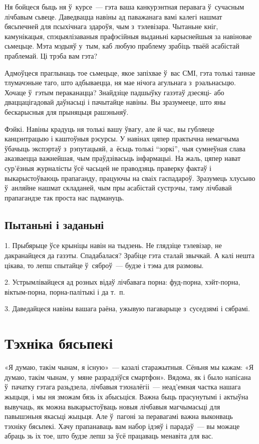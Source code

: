 Ня бойцеся быць ня ў~курсе~--- гэта ваша канкурэнтная перавага ў~сучасным лічбавым сьвеце. Даведвацца навіны ад паважанага вамі калегі нашмат бясьпечней для псыхічнага здароўя, чым з~тэлевізара. Чытаньне кніг, камунікацыя, спэцыялізаваныя прафэсійныя выданьні карыснейшыя за навіновае сьмецьце. Мэта мэдыяў у~тым, каб любую праблему зрабіць тваёй асабістай праблемай. Ці трэба вам гэта?

Адмоўцеся праглынаць тое сьмецьце, якое запіхвае ў~вас СМІ, гэта толькі таннае тлумачэньне таго, што адбываецца, ня мае нічога агульнага з~рэальнасьцю. Хочаце ў~гэтым пераканацца? Знайдзіце падшыўку газэтаў дзесяці- або дваццацігадовай даўнасьці і пачытайце навіны. Вы зразумееце, што яны бескарысныя для прыняцьця рашэньняў.

Фэйкі. Навіны крадуць ня толькі вашу ўвагу, але й час, вы губляеце канцэнтрацыю і каштоўныя рэсурсы. У навінах цяпер практычна немагчыма ўбачыць экспэртаў з~рэпутацыяй, а~ёсьць толькі ``зоркі'', чыя сумнеўная слава аказваецца важнейшая, чым праўдзівасьць інфармацыі. На жаль, цяпер нават сур'ёзныя журналісты ўсё часьцей не праводзяць праверку фактаў і выкарыстоўваюць прапаганду, працуючы на сваіх гаспадароў. Зразумець хлусьню ў~анляйне нашмат складаней, чым пры асабістай сустрэчы, таму лічбавай прапагандзе так проста нас падмануць.

\subsection*{Пытаньні і заданьні}

1. Прыбярыце ўсе крыніцы навін на тыдзень. Не глядзіце тэлевізар, не дакранайцеся да газэты. Спадабалася? Зрабіце гэта сталай звычкай. А калі нешта цікава, то лепш спытайце ў~сяброў~--- будзе і тэма для размовы.

2. Устрымлівайцеся ад розных відаў лічбавага порна: фуд-порна, хэйт-порна, віктым-порна, порна-палітыкі і да т.~п.

3. Даведайцеся навіны вашага раёна, ужывую пагаварыце з~суседзямі і сябрамі.


\section{Тэхніка бясьпекі}

«Я думаю, такім чынам, я існую»~--- казалі старажытныя. Сёньня мы кажам: «Я думаю, такім чынам, у~мяне разрадзіўся смартфон». Вядома, як і было напісана ў~пачатку гэтага разьдзела, лічбавыя тэхналёгіі~--- неад'емная частка нашага жыцьця, і мы ня зможам бязь іх абысьціся. Важна быць прасунутымі і актыўна вывучаць, як можна выкарыстоўваць новыя лічбавыя магчымасьці для павышэньня якасьці жыцьця. Але ў~пагоні за перавагамі важна выконваць тэхніку бясьпекі. Хачу прапанаваць вам набор ідэяў і парадаў~--- вы можаце абраць зь іх тое, што будзе лепш за ўсё працаваць менавіта для вас.

